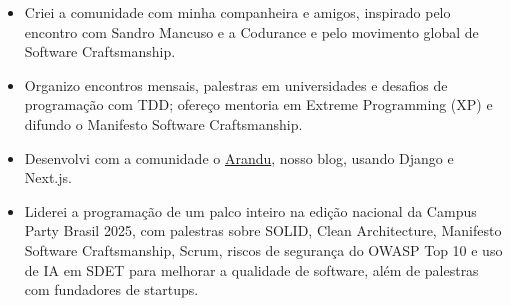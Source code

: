 \documentclass[10pt,a4paper]{altacv}
\begin{document}
\begin{itemize}
\setlength{\itemindent}{0.5em}
\item[--] Criei a comunidade com minha companheira e amigos, inspirado pelo encontro com Sandro Mancuso e a Codurance e pelo movimento global de Software Craftsmanship.
\item[--] Organizo encontros mensais, palestras em universidades e desafios de programação com TDD; ofereço mentoria em Extreme Programming (XP) e difundo o Manifesto Software Craftsmanship.
\item[--] Desenvolvi com a comunidade o \href{https://dwcorp.com.br/arandu}{Arandu}, nosso blog, usando Django e Next.js.
\item[--] Liderei a programação de um palco inteiro na edição nacional da Campus Party Brasil 2025, com palestras sobre SOLID, Clean Architecture, Manifesto Software Craftsmanship, Scrum, riscos de segurança do OWASP Top 10 e uso de IA em SDET para melhorar a qualidade de software, além de palestras com fundadores de startups.
\end{itemize}

\newpage
{}

\end{document}
